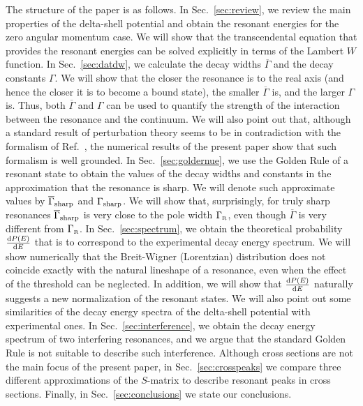 \documentclass[12pt]{article}
\newcommand{\rmd}{{\rm d}}
\newcommand{\gr}{\Gamma _{\text{\tiny R}}}
\begin{document}
The structure of the paper is as follows. In Sec.~\ref{sec:review}, we 
review the main properties of the
delta-shell potential and obtain the resonant energies for the zero angular
momentum case. We will show that the transcendental equation that provides 
the resonant energies can be solved explicitly in terms of the Lambert
$W$ function. In Sec.~\ref{sec:datdw}, we calculate the decay widths
$\overline{\Gamma}$ and the decay constants $\Gamma$. We will show that
the closer the resonance is to the real axis (and hence the closer it 
is to become a bound state), the smaller $\overline{\Gamma}$ is, and the
larger $\Gamma$ is. Thus, both $\overline{\Gamma}$ and $\Gamma$ can be 
used to quantify the strength of the interaction between the resonance 
and the continuum. We will also point out that, although a standard 
result of perturbation theory seems to be in contradiction with the
formalism of Ref.~\cite{NPA15}, the numerical results of the
present paper show that such formalism is well grounded. In 
Sec.~\ref{sec:goldernue}, we use
the Golden Rule of a resonant state to obtain the values of
the decay widths and constants in the approximation that the resonance
is sharp. We will denote such approximate values 
by $\overline{\Gamma}_{\rm sharp}$ and $\Gamma _{\rm sharp}$. We will show that,
surprisingly, for truly sharp resonances $\overline{\Gamma}_{\rm sharp}$ is very
close to the pole width $\gr$, even though $\overline{\Gamma}$ is very
different from $\gr$. In Sec.~\ref{sec:spectrum}, we obtain the
theoretical probability $\frac{\rmd P (E)}{\rmd E}$ that is to correspond 
to the experimental decay energy spectrum. We will show numerically that 
the Breit-Wigner (Lorentzian) distribution does not coincide exactly with 
the natural lineshape of a resonance, even when
the effect of the threshold can be neglected. In addition, we will show that
$\frac{\rmd P (E)}{\rmd E}$ naturally suggests
a new normalization of the resonant states. We will also point
out some similarities of the decay energy spectra of the delta-shell
potential with experimental ones. In Sec.~\ref{sec:interference},
we obtain the decay energy spectrum of two interfering resonances, and we
argue that the standard Golden Rule is not suitable to describe such
interference. Although cross sections are not the main focus of the
present paper, in 
Sec.~\ref{sec:crosspeaks} we compare three different approximations
of the $S$-matrix to describe resonant peaks in cross sections.
Finally, in Sec.~\ref{sec:conclusions} we state 
our conclusions.
\end{document}
